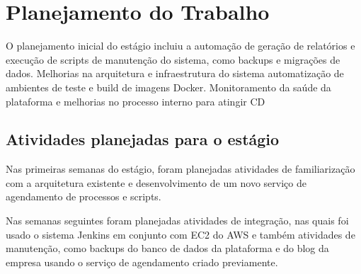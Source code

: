 \chapter{Planejamento do Trabalho}\label{chap:atividadesPlanejadas}

O planejamento inicial do estágio incluiu a automação de geração de relatórios e execução de scripts de manutenção do sistema, como backups e migrações de dados. Melhorias na arquitetura e infraestrutura do sistema automatização de ambientes de teste e build de imagens \gls{Docker}. Monitoramento da saúde da plataforma e melhorias no processo interno para atingir \gls{CD}


\section{Atividades planejadas para o estágio}



Nas primeiras semanas do estágio, foram planejadas atividades de familiarização com a arquitetura existente e desenvolvimento de um novo serviço de agendamento de processos e scripts.

Nas semanas seguintes foram planejadas atividades de integração, nas quais foi usado o sistema \gls{Jenkins} em conjunto com \gls{EC2} do \gls{AWS} e também atividades de manutenção, como backups do banco de dados da plataforma e do blog da empresa usando o serviço de agendamento criado previamente.

